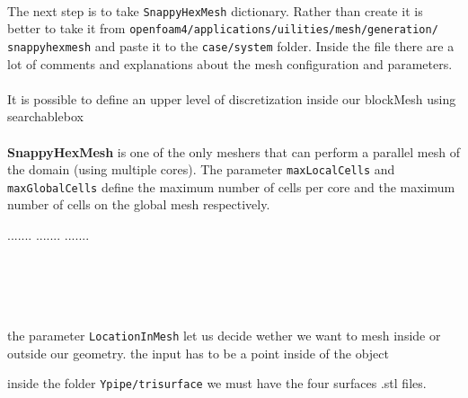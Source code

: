 \paragraph{}The next step is to take \texttt{SnappyHexMesh} dictionary. Rather than create it is better to take it from \texttt{openfoam4/applications/uilities/mesh/generation/\\snappyhexmesh} and paste it to the \texttt{case/system} folder. Inside the file there are a lot of comments and explanations about the mesh configuration and parameters.

\paragraph{}It is possible to define an upper level of discretization inside our blockMesh using searchablebox

\paragraph{}\textbf{SnappyHexMesh} is one of the only meshers that can perform a parallel mesh of the domain (using multiple cores). The parameter \texttt{maxLocalCells} and \texttt{maxGlobalCells} define the maximum number of cells per core and the maximum number of cells on the global mesh respectively.



.......
.......
.......\\\\\\\\\


the parameter \texttt{LocationInMesh} let us decide wether we want to mesh inside or outside our geometry. the input has to be a point inside of the object

inside the folder \texttt{Ypipe/trisurface} we must have the four surfaces .stl files.